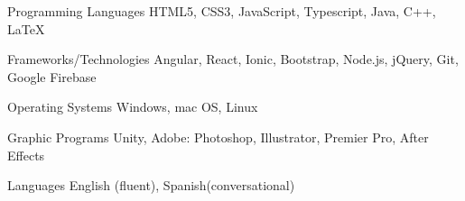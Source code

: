 
\begin{cvskills}
  \cvskill
    {Programming Languages} %
    {HTML5, CSS3, JavaScript, Typescript, Java, C++, LaTeX} %

  \cvskill
    {Frameworks/Technologies} %
    {Angular, React, Ionic, Bootstrap, Node.js, jQuery, Git, Google Firebase} %
    
    \cvskill
    {Operating Systems}
    {Windows, mac OS, Linux}
    
    \cvskill
    {Graphic Programs} %
    {Unity, Adobe: Photoshop, Illustrator, Premier Pro, After Effects}
    
    \cvskill
    {Languages}
    {English (fluent), Spanish(conversational)}
    
    
\end{cvskills}
